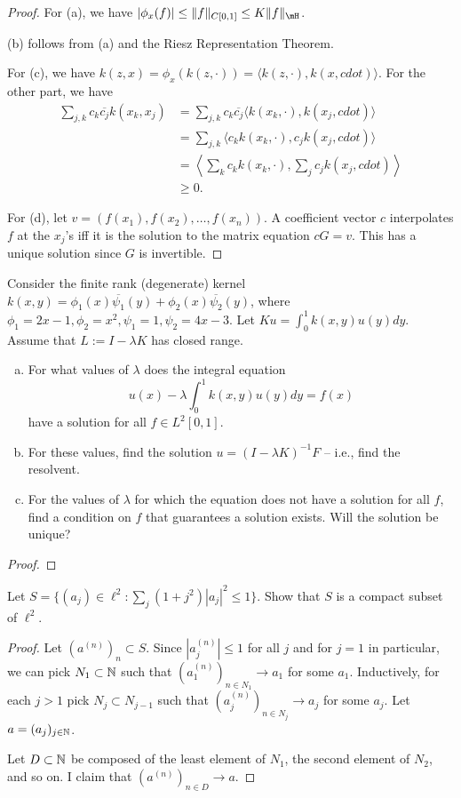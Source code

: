 \documentclass{article}
\begin{document}
\begin{proof}
For (a), we have $|\phi_x(f)| \le \|f\|_{C[0,1]} \le K \|f\|_\mH$.

(b) follows from (a) and the Riesz Representation Theorem.

For (c), we have $k(z,x) = \phi_x(k(z, \cdot)) = \langle k(z, \cdot) , k(x, cdot) \rangle$.  For the other part, we have  
\begin{align*}
\sum_{j,k} c_k \overline{c_j} k(x_k, x_j) & =  \sum_{j,k} c_k \overline{c_j} \langle k(x_k, \cdot) , k(x_j, cdot) \rangle
\\ & =  \sum_{j,k} \langle c_k k(x_k, \cdot) , c_j k(x_j, cdot) \rangle
\\ & =  \left\langle \sum_k c_k k(x_k, \cdot) , \sum_j c_j k(x_j, cdot) \right \rangle
\\ & \ge 0.
\end{align*}

For (d), let $v = (f(x_1), f(x_2), \ldots, f(x_n))$.  A coefficient vector $c$ interpolates $f$ at the $x_j$'s iff it is the solution to the matrix equation $c G = v$. This has a unique solution since $G$ is invertible.
\end{proof}

 Consider the finite rank (degenerate) kernel $k(x,y) = \phi_1(x) \overline{\psi_1}(y) + \phi_2(x) \overline{\psi_2} (y)$, where $\phi_1 = 2x - 1, \phi_2 = x^2, \psi_1 = 1, \psi_2 = 4x - 3$. Let $Ku = \int_0^1 k(x,y) u(y) dy$. Assume that $L:= I - \lambda K$ has closed range.

\begin{enumerate}[a.]
\item For what values of $\lambda$ does the integral equation
$$u(x) - \lambda \int_0^1 k(x,y) u(y) dy = f(x)$$
have a solution for all $f \in L^2[0,1]$.
\item For these values, find the solution $u = (I - \lambda K)^{-1} F$ -- i.e., find the resolvent.
\item For the values of $\lambda$ for which the equation does not have a solution for all $f$, find a condition on $f$ that guarantees a solution exists. Will the solution be unique?
\end{enumerate}

\begin{proof}


\end{proof}


 Let $S = \{ (a_j) \in \ell^2 : \sum_j (1+j^2)|a_j|^2 \le 1 \}$. Show that $S$ is a compact subset of $\ell^2$.
\begin{proof}
Let $(a^{(n)})_n \subset S$. Since $|a_j^{(n)}| \le 1$ for all $j$ and for $j=1$ in particular, we can pick $N_1 \subset \mathbb{N}$ such that $(a_1^{(n)})_{n \in N_1} \to a_1$ for some $a_1$.  Inductively, for each $j > 1$ pick $N_j \subset N_{j-1}$ such that $(a_j^{(n)})_{n \in N_j} \to a_j$ for some $a_j$.  Let $a = (a_j)_{j \in \mathbb{N}}$.

Let $D \subset \mathbb{N}$ be composed of the least element of $N_1$, the second element of $N_2$, and so on.  I claim that $(a^{(n)})_{n \in D} \to a$. 
\end{proof}
\end{document}
